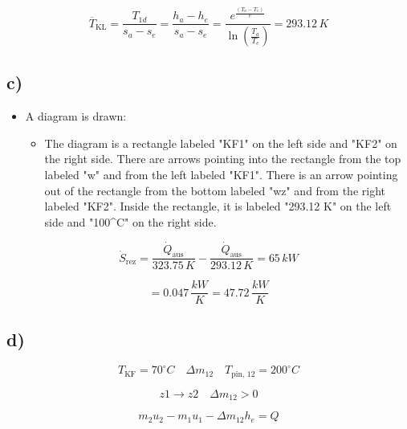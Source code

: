 \begin{equation*}
\overline{T}_{\text{KL}} = \frac{T_{1d}}{s_{a} - s_{e}} = \frac{h_{a} - h_{e}}{s_{a} - s_{e}} = \frac{e^{\frac{(T_{a} - T_{e})}{e}}}{\ln \left( \frac{T_{a}}{T_{e}} \right)} = 293.12 \, K
\end{equation*}

\subsection*{c)}

\begin{itemize}
    \item A diagram is drawn:
    \begin{itemize}
        \item The diagram is a rectangle labeled "KF1" on the left side and "KF2" on the right side. There are arrows pointing into the rectangle from the top labeled "w" and from the left labeled "KF1". There is an arrow pointing out of the rectangle from the bottom labeled "wz" and from the right labeled "KF2". Inside the rectangle, it is labeled "293.12 K" on the left side and "100^\circ C" on the right side.
    \end{itemize}
\end{itemize}

\begin{equation*}
\dot{S}_{\text{rez}} = \frac{\dot{Q}_{\text{aus}}}{323.75 \, K} - \frac{\dot{Q}_{\text{aus}}}{293.12 \, K} = 65 \, kW
\end{equation*}

\begin{equation*}
= 0.047 \, \frac{kW}{K} = 47.72 \, \frac{kW}{K}
\end{equation*}

\subsection*{d)}

\begin{equation*}
T_{\text{KF}} = 70^\circ C \quad \Delta m_{12} \quad T_{\text{pin, 12}} = 200^\circ C
\end{equation*}

\begin{equation*}
z1 \rightarrow z2 \quad \Delta m_{12} > 0
\end{equation*}

\begin{equation*}
m_{2} u_{2} - m_{1} u_{1} - \Delta m_{12} h_{e} = Q
\end{equation*}

